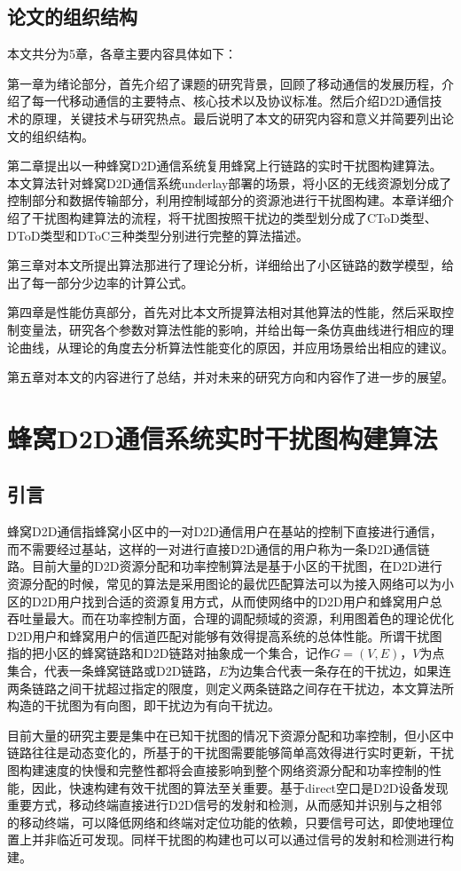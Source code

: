 \documentclass[figurelist,tablelist,algorithmlist,nomlist,masters]{seuthesix}
\begin{document}
	
	\section{论文的组织结构}
	本文共分为5章，各章主要内容具体如下：
	
	第一章为绪论部分，首先介绍了课题的研究背景，回顾了移动通信的发展历程，介绍了每一代移动通信的主要特点、核心技术以及协议标准。然后介绍D2D通信技术的原理，关键技术与研究热点。最后说明了本文的研究内容和意义并简要列出论文的组织结构。
	
	第二章提出以一种蜂窝D2D通信系统复用蜂窝上行链路的实时干扰图构建算法。本文算法针对蜂窝D2D通信系统underlay部署的场景，将小区的无线资源划分成了控制部分和数据传输部分，利用控制域部分的资源池进行干扰图构建。本章详细介绍了干扰图构建算法的流程，将干扰图按照干扰边的类型划分成了CToD类型、DToD类型和DToC三种类型分别进行完整的算法描述。
	
	第三章对本文所提出算法那进行了理论分析，详细给出了小区链路的数学模型，给出了每一部分少边率的计算公式。
	
	第四章是性能仿真部分，首先对比本文所提算法相对其他算法的性能，然后采取控制变量法，研究各个参数对算法性能的影响，并给出每一条仿真曲线进行相应的理论曲线，从理论的角度去分析算法性能变化的原因，并应用场景给出相应的建议。
	
	第五章对本文的内容进行了总结，并对未来的研究方向和内容作了进一步的展望。
	
	\chapter{蜂窝D2D通信系统实时干扰图构建算法}
	\section{引言}
	蜂窝D2D通信指蜂窝小区中的一对D2D通信用户在基站的控制下直接进行通信，而不需要经过基站，这样的一对进行直接D2D通信的用户称为一条D2D通信链路。目前大量的D2D资源分配和功率控制算法是基于小区的干扰图，在D2D进行资源分配的时候，常见的算法是采用图论的最优匹配算法可以为接入网络可以为小区的D2D用户找到合适的资源复用方式，从而使网络中的D2D用户和蜂窝用户总吞吐量最大。而在功率控制方面，合理的调配频域的资源，利用图着色的理论优化D2D用户和蜂窝用户的信道匹配对能够有效得提高系统的总体性能。所谓干扰图指的把小区的蜂窝链路和D2D链路对抽象成一个集合，记作$G=(V,E)$，$V$为点集合，代表一条蜂窝链路或D2D链路，$E$为边集合代表一条存在的干扰边，如果连两条链路之间干扰超过指定的限度，则定义两条链路之间存在干扰边，本文算法所构造的干扰图为有向图，即干扰边为有向干扰边。
	
	目前大量的研究主要是集中在已知干扰图的情况下资源分配和功率控制，但小区中链路往往是动态变化的，所基于的干扰图需要能够简单高效得进行实时更新，干扰图构建速度的快慢和完整性都将会直接影响到整个网络资源分配和功率控制的性能，因此，快速构建有效干扰图的算法至关重要。基于direct空口是D2D设备发现重要方式，移动终端直接进行D2D信号的发射和检测，从而感知并识别与之相邻的移动终端，可以降低网络和终端对定位功能的依赖，只要信号可达，即使地理位置上并非临近可发现。同样干扰图的构建也可以可以通过信号的发射和检测进行构建。
	
\end{document}
